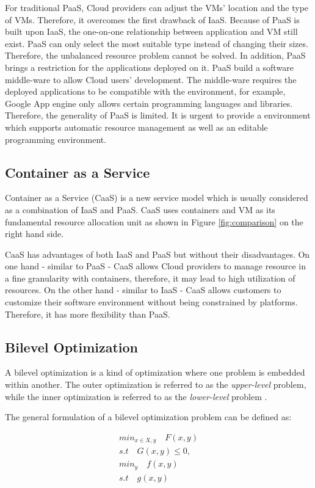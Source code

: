 For traditional PaaS, Cloud providers can adjust the VMs' location and the type of VMs. Therefore, it overcomes the first drawback of IaaS. Because of PaaS is built upon IaaS, the one-on-one relationship between application and VM still exist. PaaS can only select the most suitable type instead of changing their sizes. Therefore, the unbalanced resource problem cannot be solved. In addition, PaaS brings a restriction for the applications deployed on it. PaaS build a software middle-ware to allow Cloud users' development. The middle-ware requires the deployed applications to be compatible with the environment, for example, Google App engine only allows certain programming languages and libraries. Therefore, the generality of PaaS is limited. It is urgent to provide a environment which supports automatic resource management as well as an editable programming environment.


\subsection{Container as a Service}
Container as a Service (CaaS) \cite{Piraghaj:2017vi} is a new service model which is usually considered as a combination of IaaS and PaaS. CaaS uses containers and VM as its fundamental resource allocation unit as shown in Figure \ref{fig:comparison} on the right hand side. 


CaaS has advantages of both IaaS and PaaS  but without their disadvantages. On one hand - similar to PaaS - CaaS allows Cloud providers to manage resource in a fine granularity with containers, therefore, it may lead to high utilization of resources. On the other hand - similar to IaaS - CaaS allows customers to customize their software environment without being constrained by platforms. Therefore, it has more flexibility than PaaS.
	
\subsection{Bilevel Optimization}
\label{bilevel}

A bilevel optimization \cite{Colson:2007bu} is a kind of optimization where one problem is embedded within another. The outer optimization is referred to as the \emph{upper-level} problem, while the inner optimization is referred to as the \emph{lower-level} problem . 

The general formulation of a bilevel optimization problem can be defined as: 

\begin{subequations}
\label{eq:bilevel}
	\begin{align}
	min_{x \in X, y} 	\quad    F(x, y) \\
	s.t 			\quad G(x, y) \leq 0, \\
	min_y			\quad f(x, y) \\
	s.t 			\quad g(x, y)
	\end{align}
\end{subequations}

